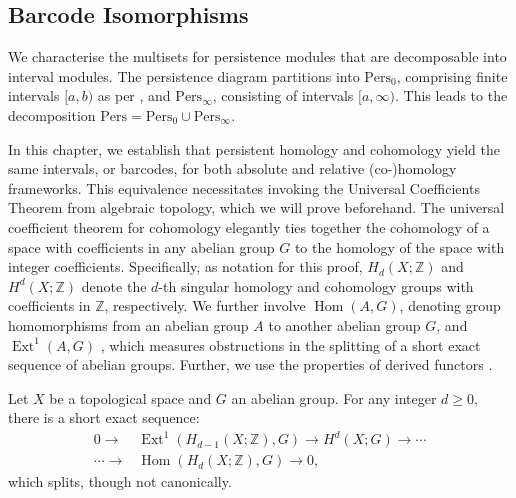 \subsection{Barcode Isomorphisms}
\label{BarcodeIsomorphisms}
We characterise the multisets for persistence modules that are decomposable into
interval modules. The persistence diagram partitions into $\mathrm{Pers}_{0}$,
comprising finite intervals $[a, b)$ as per \cite[\S 2.3]{de2011dualities}, and $\mathrm{Pers}_{\infty}$, consisting of intervals $[a, \infty)$. This leads to the decomposition
$\mathrm{Pers}= \mathrm{Pers}_{0} \cup \mathrm{Pers}_{\infty}$.

In this chapter, we establish that persistent homology and cohomology yield the
same intervals, or barcodes, for both absolute and relative (co-)homology
frameworks. This equivalence necessitates invoking the Universal Coefficients Theorem
from algebraic topology, which we will prove beforehand. The universal coefficient
theorem for cohomology elegantly ties together the cohomology of a space with coefficients
in any abelian group $G$ to the homology of the space with integer coefficients. Specifically, as notation for this proof, $H_{d}(X;\mathbb{Z})$ and
$H^{d}(X;\mathbb{Z})$ denote the $d$-th singular homology and cohomology groups
with coefficients in $\mathbb{Z}$, respectively. We further involve
$\operatorname{Hom}(A, G)$, denoting group homomorphisms from an abelian group $A$ to another
abelian group $G$, and $\operatorname{Ext}^{1}(A, G)$ \cite[\S 3.1, p.195]{hatcher2005algebraic}, which measures obstructions
in the splitting of a short exact sequence of abelian groups. Further, we use the
properties of derived functors \cite[\S 2.7]{Weibel1994}.

\begin{theorem}{\cite[Theorem 3.2]{hatcher2005algebraic}}
\label{UniversalCoefficientsforCohomology}
Let $X$ be a topological space and $G$ an abelian group. For any integer $d \geq 0$, there is a short exact sequence:
\begin{align}
0 \rightarrow &\operatorname{Ext}^{1}(H_{d-1}(X;\mathbb{Z}), G) \rightarrow H^{d}(X; G) \rightarrow \cdots \\
\cdots \rightarrow &\operatorname{Hom}(H_{d}(X;\mathbb{Z}), G) \rightarrow 0,
\end{align}
which splits, though not canonically.
\end{theorem}


